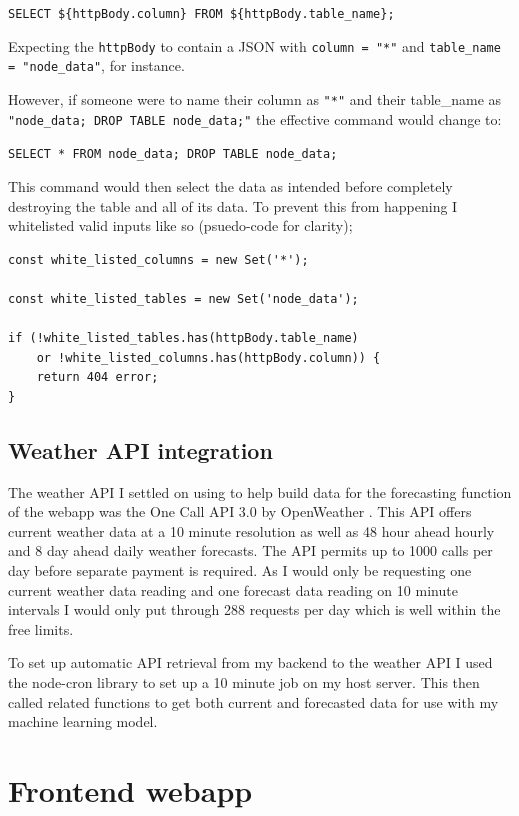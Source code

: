 \verb|SELECT ${httpBody.column} FROM ${httpBody.table_name};|

Expecting the \verb|httpBody| to contain a JSON with \texttt{column = "*"} and
\texttt{table\_name = "node\_data"}, for instance. 

However, if someone were to name their column as \texttt{"*"} and their
table\_name as \texttt{"node\_data; DROP TABLE node\_data;"} the effective
command would change to:

\verb|SELECT * FROM node_data; DROP TABLE node_data;|

This command would then select the data as intended before completely destroying
the table and all of its data. To prevent this from happening I whitelisted
valid inputs like so (psuedo-code for clarity);

\begin{verbatim}
const white_listed_columns = new Set('*');

const white_listed_tables = new Set('node_data');

if (!white_listed_tables.has(httpBody.table_name) 
    or !white_listed_columns.has(httpBody.column)) {
    return 404 error;
}
\end{verbatim}

\subsection{Weather API integration}

The weather API I settled on using to help build data for the forecasting
function of the webapp was the One Call API 3.0 by OpenWeather
\cite{openweatherAPI}. This API offers current weather data at a 10 minute
resolution as well as 48 hour ahead hourly and 8 day ahead daily weather
forecasts. The API permits up to 1000 calls per day before separate payment is
required. As I would only be requesting one current weather data reading and one
forecast data reading on 10 minute intervals I would only put through 288
requests per day which is well within the free limits.

To set up automatic API retrieval from my backend to the weather API I used the
node-cron library \cite{node-cron} to set up a 10 minute job on my host server.
This then called related functions to get both current and forecasted data for
use with my machine learning model.

\section{Frontend webapp}\label{sec:front-end}

